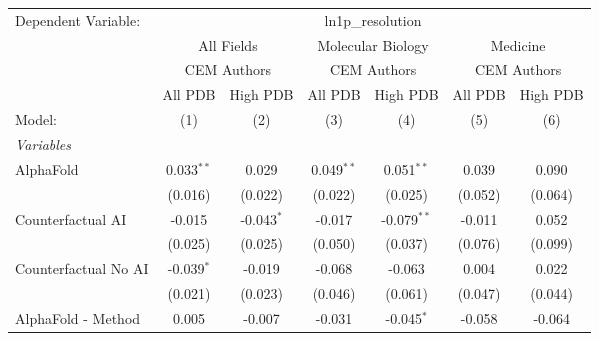 \begingroup
\centering
\begin{tabular}{lcccccc}
   \tabularnewline \midrule \midrule
   Dependent Variable: & \multicolumn{6}{c}{ln1p\_resolution}\\
 & \multicolumn{2}{c}{All Fields} & \multicolumn{2}{c}{Molecular Biology} & \multicolumn{2}{c}{Medicine} \\
\cmidrule(lr){2-3} \cmidrule(lr){4-5} \cmidrule(lr){6-7}
 & \multicolumn{2}{c}{CEM Authors} & \multicolumn{2}{c}{CEM Authors} & \multicolumn{2}{c}{CEM Authors} \\
\cmidrule(lr){2-3} \cmidrule(lr){4-5} \cmidrule(lr){6-7}
 & \multicolumn{1}{c}{All PDB} & \multicolumn{1}{c}{High PDB} & \multicolumn{1}{c}{All PDB} & \multicolumn{1}{c}{High PDB} & \multicolumn{1}{c}{All PDB} & \multicolumn{1}{c}{High PDB} \\
\cmidrule(lr){2-2} \cmidrule(lr){3-3} \cmidrule(lr){4-4} \cmidrule(lr){5-5} \cmidrule(lr){6-6} \cmidrule(lr){7-7}
   Model:                                                     & (1)           & (2)          & (3)           & (4)           & (5)           & (6)\\  
   \midrule
   \emph{Variables}\\
   AlphaFold                                                  & 0.033$^{**}$  & 0.029        & 0.049$^{**}$  & 0.051$^{**}$  & 0.039         & 0.090\\   
                                                              & (0.016)       & (0.022)      & (0.022)       & (0.025)       & (0.052)       & (0.064)\\   
   Counterfactual AI                                          & -0.015        & -0.043$^{*}$ & -0.017        & -0.079$^{**}$ & -0.011        & 0.052\\   
                                                              & (0.025)       & (0.025)      & (0.050)       & (0.037)       & (0.076)       & (0.099)\\   
   Counterfactual No AI                                       & -0.039$^{*}$  & -0.019       & -0.068        & -0.063        & 0.004         & 0.022\\   
                                                              & (0.021)       & (0.023)      & (0.046)       & (0.061)       & (0.047)       & (0.044)\\   
   AlphaFold - Method                                         & 0.005         & -0.007       & -0.031        & -0.045$^{*}$  & -0.058        & -0.064\\   

\end{tabular}

